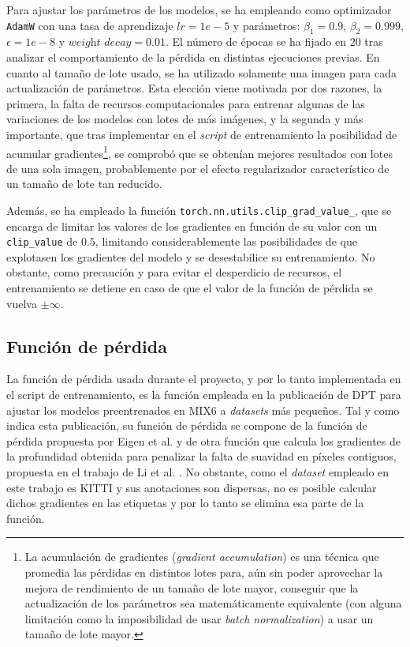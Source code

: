 Para ajustar los parámetros de los modelos, se ha empleando como optimizador \texttt{AdamW} con una tasa de aprendizaje $lr = 1e-5$ y parámetros: $\beta_1 = 0.9$, $\beta_2 = 0.999$, $\epsilon = 1e-8$ y $\textit{weight decay} = 0.01$. El número de épocas se ha fijado en $20$ tras analizar el comportamiento de la pérdida en distintas ejecuciones previas. En cuanto al tamaño de lote usado, se ha utilizado solamente una imagen para cada actualización de parámetros. Esta elección viene motivada por dos razones, la primera, la falta de recursos computacionales para entrenar algunas de las variaciones de los modelos con lotes de más imágenes, y la segunda y más importante, que tras implementar en el \textit{script} de entrenamiento la posibilidad de acumular gradientes\footnote{La acumulación de gradientes (\textit{gradient accumulation}) es una técnica que promedia las pérdidas en distintos lotes para, aún sin poder aprovechar la mejora de rendimiento de un tamaño de lote mayor, conseguir que la actualización de los parámetros sea matemáticamente equivalente (con alguna limitación como la imposibilidad de usar \textit{batch normalization}) a usar un tamaño de lote mayor.}, se comprobó que se obtenían mejores resultados con lotes de una sola imagen, probablemente por el efecto regularizador característico de un tamaño de lote tan reducido.

Además, se ha empleado la función \texttt{torch.nn.utils.clip\_grad\_value\_}, que se encarga de limitar los valores de los gradientes en función de su valor con un \texttt{clip\_value} de $0.5$, limitando considerablemente las posibilidades de que explotasen los gradientes del modelo y se desestabilice su entrenamiento. No obstante, como precaución y para evitar el desperdicio de recursos, el entrenamiento se detiene en caso de que el valor de la función de pérdida se vuelva $\pm \infty$.


\subsection{Función de pérdida}
La función de pérdida usada durante el proyecto, y por lo tanto implementada en el script de entrenamiento, es la función empleada en la publicación de DPT \cite{visiontransformersDPT} para ajustar los modelos preentrenados en MIX6 a \textit{datasets} más pequeños. Tal y como indica esta publicación, su función de pérdida se compone de la función de pérdida propuesta por Eigen et al. \cite{eigen-multi-scale} y de otra función que calcula los gradientes de la profundidad obtenida para penalizar la falta de suavidad en píxeles contiguos, propuesta en el trabajo de Li et al. \cite{MegaDepthLi18}. No obstante, como el \textit{dataset} empleado en este trabajo es KITTI y sus anotaciones son dispersas, no es posible calcular dichos gradientes en las etiquetas y por lo tanto se elimina esa parte de la función. 

